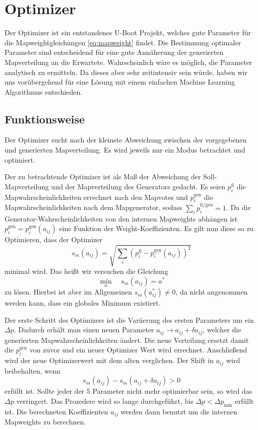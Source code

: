 \section{Optimizer}


\label{sub:optimizer}
Der Optimizer ist ein entstandenes U-Boot Projekt, welches gute Parameter für die Mapweightgleichungen \ref{eq:mapweight} findet.
Die Bestimmung optimaler Parameter sind entscheidend für eine gute Annäherung der generierten Mapverteilung an die Erwartete.
Wahrscheinlich wäre es möglich, die Parameter analytisch zu ermitteln. Da dieses aber sehr zeitintensiv sein würde,
haben wir uns vorübergehend für eine Lösung mit einem einfachen \glqq{}Machine Learning\grqq{} Algorithmus entschieden.
\subsection{Funktionsweise}
Der Optimizer sucht nach der kleinste Abweichung zwischen der vorgegebenen und generierten Mapverteilung.
Es wird jeweils nur ein Modus betrachtet und optimiert.

Der zu betrachtende Optimizer ist als Maß der Abweichung der \glqq{}Soll-Mapverteilung\grqq{} und der Mapverteilung des Generators gedacht.
Es seien $p_i^\text{fi}$ die Mapwahrscheinlichkeiten errechnet nach den Mapvotes und $p_i^\text{gen}$ die Mapwahrscheinlichkeiten nach dem Mapgenerator, sodass $\sum_i p_i^\text{fi/gen}=1$.
Da die Generator-Wahrscheinlichkeiten von den internen Mapweights abhängen ist $p_i^\text{gen}=p_i^\text{gen}(a_{ij})$ eine Funktion der Weight-Koeffizienten.
Es gilt nun diese so zu Optimieren, dass der Optimizer
\begin{equation}
    s_m(a_{ij}) = \sqrt{\sum_i \left(p_i^\text{fi}-p_i^\text{gen}(a_{ij})\right)^2}
\end{equation}
minimal wird.
Das heißt wir versuchen die Gleichung
\begin{equation}
    \underset{a}{\min}\quad s_m(a_{ij}) = a^*
\end{equation}
zu lösen.
Hierbei ist aber im Allgemeinen $s_m(a^*_{ij}) \neq 0$, da nicht angenommen werden kann, dass ein globales Minimum existiert.

Der erste Schritt des Optimizers ist die Variierung des ersten Parameters um ein $\varDelta p$.
Dadurch erhält man einen neuen Parameter $a_{ij} \rightarrow a_{ij} + \delta a_{ij}$, welcher die generierten Mapwahrscheinlichkeiten ändert.
Die neue Verteilung ersetzt damit die $p_i^\text{gen}$ von zuvor und ein neuer Optimizer Wert wird errechnet.
Anschließend wird der neue Optimizerwert mit dem alten verglichen.
Der Shift in $a_{ij}$ wird beibehalten, wenn
\begin{equation}
    s_m(a_{ij}) - s_m(a_{ij}+\delta a_{ij}) > 0
\end{equation}
erfüllt ist.
Sollte jeder der 5 Parameter nicht mehr optimierbar sein, so wird das $\varDelta p$ verringert.
Das Prozedere wird so lange durchgeführt, bis $\varDelta p < \varDelta p_\text{min}$ erfüllt ist.
Die berechneten Koeffizienten $a_{ij}$ werden dann benutzt um die internen Mapweights zu berechnen.
